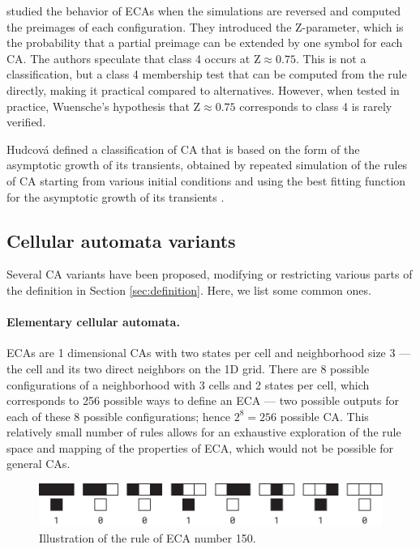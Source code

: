 \textcite{wuenscheGlobalDynamicsCellular1992} studied the behavior of \acp{ECA}
when the simulations are reversed and computed the preimages of each
configuration. They introduced the Z-parameter, which is the probability that a
partial preimage can be extended by one symbol for each \ac{CA}. The authors speculate
that class 4 occurs at $\text{Z} \approx 0.75$. This is not a classification, but a
class 4 membership test that can be computed from the rule directly, making it
practical compared to alternatives. However, when tested in practice, Wuensche's
hypothesis that $\text{Z} \approx 0.75$ corresponds to class 4 is rarely verified.

Hudcová defined a classification of \ac{CA} that is based on the form of the
asymptotic growth of its transients, obtained by repeated simulation of
the rules of \ac{CA} starting from various initial conditions and using the best
fitting function for the asymptotic growth of its transients
\parencite{hudcovaClassificationComplexSystems2020,
  hudcovaClassificationDiscreteDynamical2022}.

\subsection{Cellular automata variants}

Several \ac{CA} variants have been proposed, modifying or
restricting various parts of the definition in Section \ref{sec:definition}.
Here, we list some common ones.

\paragraph{Elementary cellular automata.\label{sec:elem-cell-autom}}
\Acp{ECA} are 1 dimensional \acp{CA} with two states per cell and
neighborhood size 3 --- the cell and its two direct neighbors on the 1D grid.
There are 8 possible configurations of a neighborhood with 3 cells and 2 states
per cell, which corresponds to 256 possible ways to define an \ac{ECA} --- two
possible outputs for each of these 8 possible configurations; hence
$2^{8} = 256$ possible \ac{CA}. This relatively small number of rules allows for an
exhaustive exploration of the rule space and mapping of the properties of \ac{ECA},
which would not be possible for general \acp{CA}.

\begin{figure}[htbp]
  \centering
  \includegraphics[width=.95\linewidth]{figures/eca_150_rule}
  \caption{Illustration of the rule of \ac{ECA} number 150.}
  \label{fig:eca_150_rule}
\end{figure}

